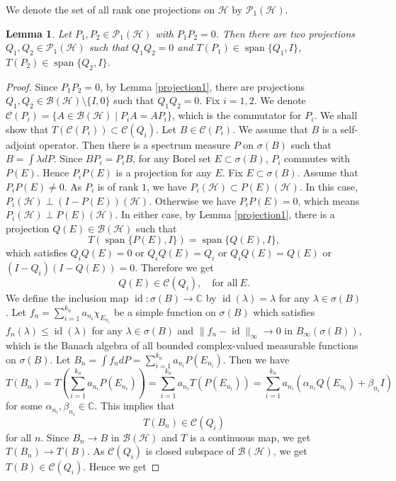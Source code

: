 \documentclass[11pt]{amsart}
\newtheorem{lemma}[theorem]{Lemma}
\theoremstyle{remark}
\newcommand{\BH}{\mathcal{B(H)}}
\newcommand{\cH}{{\mathcal{H}}}
\newcommand{\PH}{\mathcal{P}_1(\cH)}
\newcommand{\Span}{\operatorname{span}}
\begin{document}
We denote the set of all rank one projections on $\cH$ by $\PH$. 
\begin{lemma}\label{comm}
Let $P_1, P_2 \in \PH$ with $P_1P_2=0$. Then there are two projections $Q_1, Q_2 \in \PH$ %
such that $Q_1Q_2=0$ and $T(P_1) \in \operatorname{span}\{Q_1, I\}$, $T(P_2) \in \operatorname{span}\{Q_2, I\}$. 
\end{lemma}
\begin{proof}
Since $P_1P_2=0$, by Lemma \ref{projection1}, there are projections $Q_1, Q_2 \in \BH \setminus \{I,0\}$ such that $Q_1Q_2=0$. Fix $i=1,2$. We denote $\mathcal{C}(P_i)=\{ A \in \BH \mid P_iA=AP_i\}$, which is the commutator for  $P_i$. We shall show that $T(\mathcal{C}(P_i)) \subset \mathcal{C}(Q_i)$. Let $B \in \mathcal{C}(P_i)$. We assume that $B$ is a self-adjoint operator. Then there is a spectrum measure $P$ on $\sigma(B)$ such that $B=\int \lambda dP$. Since $BP_i=P_iB$,  for any Borel set $E \subset \sigma(B)$,  $P_i$ commutes with $P(E)$. Hence $P_i P(E)$ is a projection for any $E$.   Fix $E \subset \sigma(B)$. Assume that $P_i P(E) \neq 0$. As $P_i$ is  of rank $1$, we have $P_i(\cH)  \subset P(E)(\cH)$. In this case, $P_i (\cH) \perp (I-P(E))(\cH)$. Otherwise we have $P_i P(E) =0$, which means $P_i(\cH) \perp P(E)(\cH)$. In either case,  by Lemma \ref{projection1}, there is a projection $Q(E) \in \BH $
such that  
\[
T(\Span\{P(E) , I\})=\Span \{ Q(E), I\},
\]
which satisfies $Q_iQ(E)=0$ or $Q_iQ(E)=Q_i$ or $Q_iQ(E)=Q(E)$ or $(I-Q_i)(I-Q(E))=0$. Therefore  we get 
\[
Q(E) \in \mathcal{C}(Q_i), \quad \text{for all} \ E. 
\]
We define the inclusion map $\operatorname{id}: \sigma(B) \to \mathbb{C}$ by $\operatorname{id}(\lambda)=\lambda$ for any $\lambda \in \sigma(B)$. 
Let $f_n=\sum_{i=1}^{k_n} a_{n_i} \chi_{E_{n_i}}$ be a simple function on $\sigma(B)$ which satisfies $f_n (\lambda) \le \operatorname{id}(\lambda) $ for any $\lambda \in \sigma(B)$ and $\|f_n-\operatorname{id}\|_{\infty} \to 0$ in $B_{\infty}(\sigma(B))$, which is the Banach algebra of all bounded complex-valued measurable functions on $\sigma(B)$. Let $B_n=\int f_n dP=\sum_{i=1}^{k_n} a_{n_i} P(E_{n_i})$. Then we have
\[
T(B_n)=T(\sum_{i=1}^{k_n} a_{n_i} P(E_{n_i}))=\sum_{i=1}^{k_n} a_{n_i} T(P(E_{n_i}))=\sum_{i=1}^{k_n} a_{n_i} (\alpha_{n_i}Q(E_{n_i})+\beta_{n_i} I)
\]
for some $\alpha_{n_i}, \beta_{n_i} \in \mathbb{C}$. This implies that 
\[
T(B_n) \in \mathcal{C}(Q_i)
\]
for all $n$. Since $B_n \to B$ in $\BH$ and $T$ is a continuous map, we get $T(B_n) \to T(B)$. As $\mathcal{C}(Q_i)$ is closed subspace of $\BH$, we get $T(B) \in \mathcal{C}(Q_i)$. Hence we get 

\end{proof}
\end{document}

